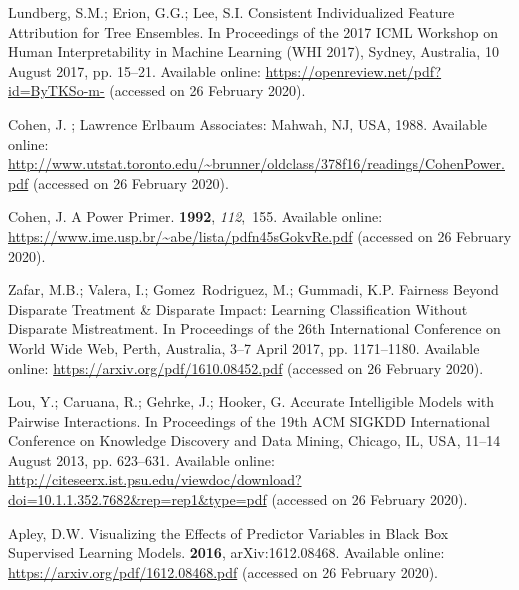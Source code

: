 \documentclass[information,article,accept,moreauthors,pdftex]{Definitions/mdpi}
\begin{document}
{\begin{thebibliography}{999}
Lundberg, S.M.; Erion, G.G.; Lee, S.I.
\newblock Consistent {I}ndividualized {F}eature {A}ttribution for {T}ree
  {E}nsembles. In Proceedings of the 2017 ICML Workshop on Human
  Interpretability in Machine Learning (WHI 2017), Sydney, Australia, 10 August 2017, pp. 15--21. 
\newblock Available online: \url{https://openreview.net/pdf?id=ByTKSo-m-} (accessed on 26 February 2020).

Cohen, J.
; Lawrence Erlbaum Associates: Mahwah, NJ, USA, 1988. 
\newblock Available online: 
  \url{http://www.utstat.toronto.edu/~brunner/oldclass/378f16/readings/CohenPower.pdf}  (accessed on 26 February 2020).

Cohen, J.
\newblock A {P}ower {P}rimer.
 {\bf 1992}, {\em 112},~155.
\newblock Available online: \url{https://www.ime.usp.br/~abe/lista/pdfn45sGokvRe.pdf} (accessed on 26 February 2020).

Zafar, M.B.; Valera, I.; Gomez~Rodriguez, M.; Gummadi, K.P.
\newblock Fairness {B}eyond {D}isparate {T}reatment \& {D}isparate {I}mpact:
  {L}earning {C}lassification {W}ithout {D}isparate {M}istreatment.
\newblock  In Proceedings of the  26th International Conference on World Wide Web, Perth, Australia, 3--7 April  2017, pp.
  1171--1180. 
\newblock Available online: \url{https://arxiv.org/pdf/1610.08452.pdf} (accessed on 26 February 2020).

Lou, Y.; Caruana, R.; Gehrke, J.; Hooker, G.
\newblock Accurate {I}ntelligible {M}odels with {P}airwise {I}nteractions.
\newblock In Proceedings of the  19th ACM SIGKDD International Conference on
  Knowledge Discovery and Data Mining,  Chicago, IL, USA, 11--14 August 2013, pp. 623--631. 
\newblock Available online: 
  \url{http://citeseerx.ist.psu.edu/viewdoc/download?doi=10.1.1.352.7682&rep=rep1&type=pdf} (accessed on 26 February 2020).

Apley, D.W.
\newblock Visualizing the {E}ffects of {P}redictor {V}ariables in {B}lack {B}ox
  {S}upervised {L}earning {M}odels.
 {\bf 2016}, arXiv:1612.08468.
\newblock Available online: \url{https://arxiv.org/pdf/1612.08468.pdf} (accessed on 26 February 2020).


\end{thebibliography}}
\end{document}
